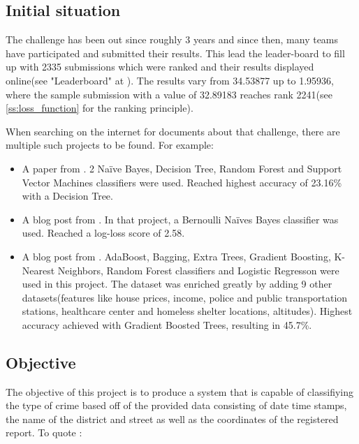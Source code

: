 \documentclass[titlepage,12pt]{article}
\begin{document}
\subsection{Initial situation}\label{ss:initial_situation}
The challenge has been out since roughly 3 years and since then, many teams have participated and submitted their results. This lead the leader-board to fill up with 2335 submissions which were ranked and their results displayed online(see "Leaderboard" at \cite{kgl_sf_crime}). The results vary from 34.53877 up to 1.95936, where the sample submission with a value of 32.89183 reaches rank 2241(see \ref{ss:loss_function} for the ranking principle).

When searching on the internet for documents about that challenge, there are multiple such projects to be found. For example:
\begin{itemize}
\item A paper from \cite{slideshare_sf_crime_prediction}. 2 Naïve Bayes, Decision Tree, Random Forest and Support Vector Machines classifiers were used. Reached highest accuracy of 23.16\% with a Decision Tree.
\item A blog post from \cite{efavdb_sf_crime_prediction}. In that project, a Bernoulli Naïves Bayes classifier was used. Reached a log-loss score of 2.58.
\item A blog post from \cite{mattmurray_blog}. AdaBoost, Bagging, Extra Trees, Gradient Boosting, K-Nearest Neighbors, Random Forest classifiers and Logistic Regresson were used in this project. The dataset was enriched greatly by adding 9 other datasets(features like house prices, income, police and public transportation stations, healthcare center and homeless shelter locations, altitudes). Highest accuracy achieved with Gradient Boosted Trees, resulting in 45.7\%.
\end{itemize}

\subsection{Objective}\label{ss:objective}
The objective of this project is to produce a system that is capable of classifiying the type of crime based off of the provided data consisting of date time stamps, the name of the district and street as well as the coordinates of the registered report. To quote \cite{kgl_sf_crime}:
\end{document}
